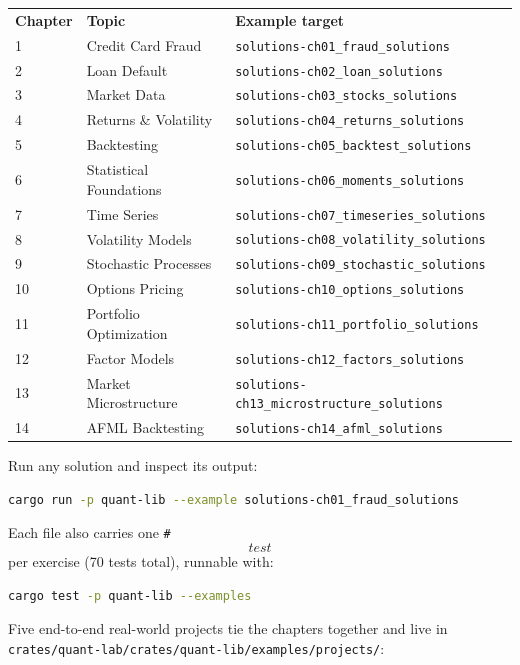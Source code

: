 \begin{center}
\begin{tabular}{lll}
\textbf{Chapter} & \textbf{Topic} & \textbf{Example target} \\
1  & Credit Card Fraud       & \texttt{solutions-ch01\_fraud\_solutions} \\
2  & Loan Default            & \texttt{solutions-ch02\_loan\_solutions} \\
3  & Market Data             & \texttt{solutions-ch03\_stocks\_solutions} \\
4  & Returns \& Volatility   & \texttt{solutions-ch04\_returns\_solutions} \\
5  & Backtesting             & \texttt{solutions-ch05\_backtest\_solutions} \\
6  & Statistical Foundations & \texttt{solutions-ch06\_moments\_solutions} \\
7  & Time Series             & \texttt{solutions-ch07\_timeseries\_solutions} \\
8  & Volatility Models       & \texttt{solutions-ch08\_volatility\_solutions} \\
9  & Stochastic Processes    & \texttt{solutions-ch09\_stochastic\_solutions} \\
10 & Options Pricing         & \texttt{solutions-ch10\_options\_solutions} \\
11 & Portfolio Optimization  & \texttt{solutions-ch11\_portfolio\_solutions} \\
12 & Factor Models           & \texttt{solutions-ch12\_factors\_solutions} \\
13 & Market Microstructure   & \texttt{solutions-ch13\_microstructure\_solutions} \\
14 & AFML Backtesting        & \texttt{solutions-ch14\_afml\_solutions} \\
\end{tabular}
\end{center}

Run any solution and inspect its output:
\begin{lstlisting}[language=bash]
cargo run -p quant-lib --example solutions-ch01_fraud_solutions
\end{lstlisting}
Each file also carries one \texttt{\#\[test\]} per exercise (70 tests
total), runnable with:
\begin{lstlisting}[language=bash]
cargo test -p quant-lib --examples
\end{lstlisting}

Five end-to-end real-world projects tie the chapters together and live
in \texttt{crates/quant-lab/crates/quant-lib/examples/projects/}:

